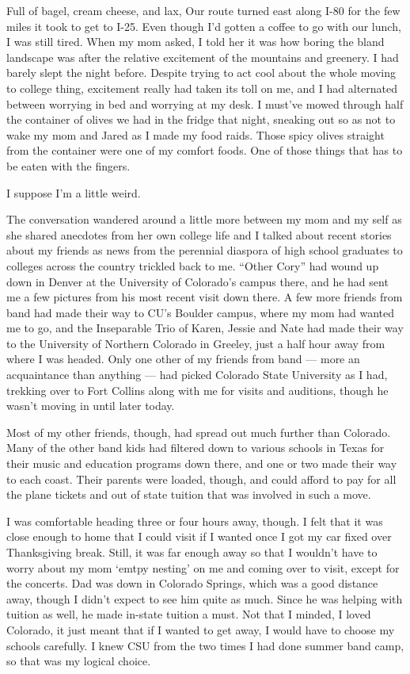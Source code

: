 Full of bagel, cream cheese, and lax, Our route turned east along I-80 for the few miles it took to get to I-25.  Even though I'd gotten a coffee to go with our lunch, I was still tired.  When my mom asked, I told her it was how boring the bland landscape was after the relative excitement of the mountains and greenery.  I had barely slept the night before.  Despite trying to act cool about the whole moving to college thing, excitement really had taken its toll on me, and I had alternated between worrying in bed and worrying at my desk.  I must've mowed through half the container of olives we had in the fridge that night, sneaking out so as not to wake my mom and Jared as I made my food raids.  Those spicy olives straight from the container were one of my comfort foods.  One of those things that has to be eaten with the fingers.

I suppose I'm a little weird.

The conversation wandered around a little more between my mom and my self as she shared anecdotes from her own college life and I talked about recent stories about my friends as news from the perennial diaspora of high school graduates to colleges across the country trickled back to me.  ``Other Cory'' had wound up down in Denver at the University of Colorado's campus there, and he had sent me a few pictures from his most recent visit down there.  A few more friends from band had made their way to CU's Boulder campus, where my mom had wanted me to go, and the Inseparable Trio of Karen, Jessie and Nate had made their way to the University of Northern Colorado in Greeley, just a half hour away from where I was headed.  Only one other of my friends from band --- more an acquaintance than anything --- had picked Colorado State University as I had, trekking over to Fort Collins along with me for visits and auditions, though he wasn't moving in until later today.

Most of my other friends, though, had spread out much further than Colorado.  Many of the other band kids had filtered down to various schools in Texas for their music and education programs down there, and one or two made their way to each coast.  Their parents were loaded, though, and could afford to pay for all the plane tickets and out of state tuition that was involved in such a move.

I was comfortable heading three or four hours away, though.  I felt that it was close enough to home that I could visit if I wanted once I got my car fixed over Thanksgiving break.  Still, it was far enough away so that I wouldn't have to worry about my mom `emtpy nesting' on me and coming over to visit, except for the concerts.  Dad was down in Colorado Springs, which was a good distance away, though I didn't expect to see him quite as much.  Since he was helping with tuition as well, he made in-state tuition a must.  Not that I minded, I loved Colorado, it just meant that if I wanted to get away, I would have to choose my schools carefully.  I knew CSU from the two times I had done summer band camp, so that was my logical choice.

